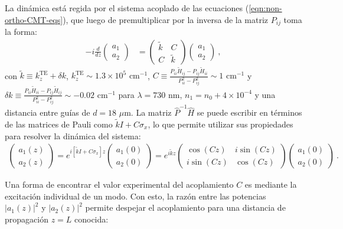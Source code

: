 La dinámica está regida por el sistema acoplado de las ecuaciones (\ref{eqn:non-ortho-CMT-eqs}), que luego de premultiplicar por la inversa de la matriz $P_{ij}$ toma la forma:
\begin{align*}
	-i\frac{d}{dz}\begin{pmatrix}
	a_1
	\\
	a_2
	\end{pmatrix} &= 	
	\begin{pmatrix}
	\tilde{k} & C
	\\
	C & \tilde{k}
	\end{pmatrix}
	\begin{pmatrix}
	a_1
	\\
	a_2
	\end{pmatrix} \ ,
\end{align*}
con $\tilde{k}\equiv k_z^{\text{TE}} + \delta k$, $k_z^{\text{TE}} \sim 1.3\times10^5 \text{ cm}^{-1}$, $C\equiv \frac{P_{ii} \tilde{H}_{ij}  -P_{ij}\tilde{H}_{ii}}{P_{ii}^2-P_{ij}^2} \sim 1\text{ cm}^{-1}$ y $\delta k \equiv \frac{P_{ii} \tilde{H}_{ii} -P_{ij}\tilde{H}_{ij}}{P_{ii}^2-P_{ij}^2} \sim -0.02\text{ cm}^{-1}$ para $\lambda = 730$ nm, $n_1 = n_0 + 4\times10^{-4}$ y una distancia entre guías de $d = 18 $ $\mu$m. La matriz $\hat{P}^{-1}\hat{H}$ se puede escribir en términos de las matrices de Pauli como $\tilde{k}I + C\sigma_x $, lo que permite utilizar sus propiedades para resolver la dinámica del sistema:
\begin{align*}
	\begin{pmatrix}
	a_1(z)
	\\
	a_2(z)
	\end{pmatrix}
	=
	e^{{i\left[\tilde{k}I + C\sigma_x\right]z }}	\begin{pmatrix}
	a_1(0)
	\\
	a_2(0)
	\end{pmatrix}
	=
	e^{i\tilde{k}z}
	\begin{pmatrix}
	\cos(Cz) & i\sin(Cz)
	\\
	i\sin(Cz) & \cos(Cz)
	\end{pmatrix}
	\begin{pmatrix}
	a_1(0)
	\\
	a_2(0)
	\end{pmatrix} \ .
\end{align*}

Una forma de encontrar el valor experimental del acoplamiento $C$ es mediante la excitación individual de un modo. Con esto, la razón entre las potencias $|a_1(z)|^2$ y $|a_2(z)|^2$ permite despejar el acoplamiento para una distancia de propagación $z=L$ conocida:


